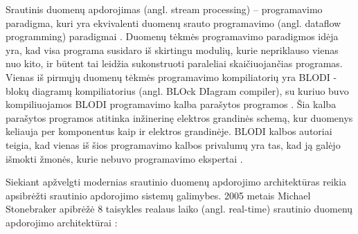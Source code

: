 \documentclass{VUMIFPSkursinis}
\begin{document}
    Srautinis duomenų apdorojimas (angl. stream processing) – programavimo paradigma, kuri yra ekvivalenti duomenų srauto programavimo (angl. dataflow programming) paradigmai \cite{shortstreamproc}. 
Duomenų tėkmės programavimo paradigmos idėja yra, kad visa programa susidaro iš skirtingu modulių, kurie nepriklauso vienas nuo kito, ir būtent tai leidžia sukonstruoti paraleliai skaičiuojančias programas. 
Vienas iš pirmųjų duomenų tėkmės programavimo kompiliatorių yra BLODI - blokų diagramų kompiliatorius (angl. BLOck DIagram compiler), su kuriuo buvo kompiliuojamos 
BLODI programavimo kalba parašytos programos \cite{kelly1961block}.  Šia kalba parašytos programos atitinka inžinerinę elektros grandinės schemą, 
kur duomenys keliauja per komponentus kaip ir elektros grandinėje. BLODI kalbos autoriai teigia, kad vienas iš šios programavimo kalbos privalumų yra tas, 
kad ją galėjo išmokti žmonės, kurie nebuvo programavimo ekspertai .\par
Siekiant apžvelgti modernias srautinio duomenų apdorojimo architektūras reikia apsibrėžti srautinio apdorojimo sistemų galimybes.
2005 metais Michael Stonebraker apibrėžė 8 taisykles realaus laiko (angl. real-time) srautinio duomenų apdorojimo architektūrai \cite{stonebraker20058}:
\end{document}
